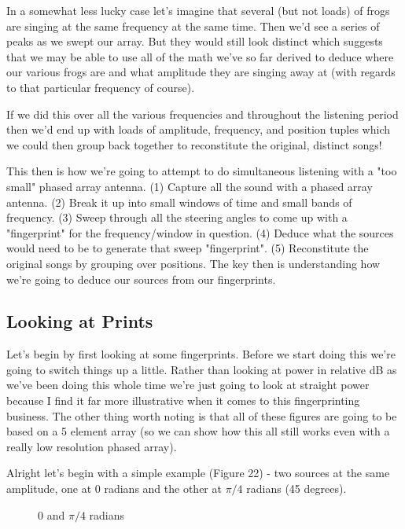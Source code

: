 \documentclass[10pt,a4paper]{article}
\begin{document}
In a somewhat less lucky case let's imagine that several (but not loads) of frogs are singing at the same frequency at the same time. Then we'd see a series of peaks as we swept our array. But they would still look distinct which suggests that we may be able to use all of the math we've so far derived to deduce where our various frogs are and what amplitude they are singing away at (with regards to that particular frequency of course). 

If we did this over all the various frequencies and throughout the listening period then we'd end up with loads of amplitude, frequency, and position tuples which we could then group back together to reconstitute the original, distinct songs! 

This then is how we're going to attempt to do simultaneous listening with a "too small" phased array antenna. (1) Capture all the sound with a phased array antenna. (2) Break it up into small windows of time and small bands of frequency. (3) Sweep through all the steering angles to come up with a "fingerprint" for the frequency/window in question. (4) Deduce what the sources would need to be to generate that sweep "fingerprint". (5) Reconstitute the original songs by grouping over positions. The key then is understanding how we're going to deduce our sources from our fingerprints.

\subsection{Looking at Prints}
Let's begin by first looking at some fingerprints. Before we start doing this we're going to switch things up a little. Rather than looking at power in relative dB as we've been doing this whole time we're just going to look at straight power because I find it far more illustrative when it comes to this fingerprinting business. The other thing worth noting is that all of these figures are going to be based on a 5 element array (so we can show how this all still works even with a really low resolution phased array). 

Alright let's begin with a simple example (Figure 22) - two sources at the same amplitude, one at 0 radians and the other at $\pi/4$ radians (45 degrees). 

\begin{figure}[!htb]
\caption{\label{fig:my-label} 0 and $\pi/4$ radians}
\end{figure}
\end{document}
